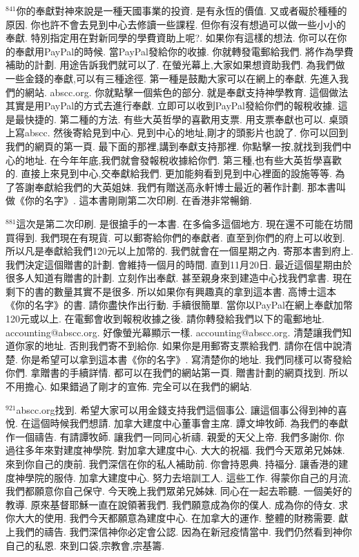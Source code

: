 \documentclass{book}
\begin{document}
$^{841}$你的奉獻對神來說是一種天國事業的投資.
是有永恆的價值.
又或者礙於種種的原因.
你也許不會去見到中心去修讀一些課程.
但你有沒有想過可以做一些小小的奉獻.
特別指定用在對新同學的學費資助上呢?.
如果你有這樣的想法.
你可以在你的奉獻用PayPal的時候.
當PayPal發給你的收據.
你就轉發電郵給我們.
將作為學費補助的計劃.
用途告訴我們就可以了.
在螢光幕上,大家如果想資助我們.
為我們做一些金錢的奉獻,可以有三種途徑.
第一種是鼓勵大家可以在網上的奉獻.
先進入我們的網站.
abscc.org.
你就點擊一個紫色的部分.
就是奉獻支持神學教育.
這個做法其實是用PayPal的方式去進行奉獻.
立即可以收到PayPal發給你們的報稅收據.
這是最快捷的.
第二種的方法.
有些大英哲學的喜歡用支票.
用支票奉獻也可以.
桌頭上寫abscc.
然後寄給見到中心.
見到中心的地址,剛才的頭影片也說了.
你可以回到我們的網頁的第一頁.
最下面的那裡,講到奉獻支持那裡.
你點擊一按,就找到我們中心的地址.
在今年年底,我們就會發報稅收據給你們.
第三種,也有些大英哲學喜歡的.
直接上來見到中心,交奉獻給我們.
更加能夠看到見到中心裡面的設施等等.
為了答謝奉獻給我們的大英姐妹.
我們有贈送高永軒博士最近的著作計劃.
那本書叫做《你的名字》.
這本書剛剛第二次印刷.
在香港非常暢銷.

$^{881}$這次是第二次印刷.
是很搶手的一本書.
在多倫多這個地方.
現在還不可能在坊間買得到.
我們現在有現貨.
可以郵寄給你們的奉獻者.
直至到你們的府上可以收到.
所以凡是奉獻給我們120元以上加幣的.
我們就會在一個星期之內.
寄那本書到府上.
我們決定這個贈書的計劃.
會維持一個月的時間.
直到11月20日.
最近這個星期由於很多人知道有贈書的計劃.
立刻作出奉獻.
甚至親身來到建造中心找我們拿書.
現在剩下的書的數量其實不是很多.
所以如果你有興趣真的拿到這本書.
高博士這本《你的名字》的書.
請你盡快作出行動.
手續很簡單.
當你以PayPal在網上奉獻加幣120元或以上.
在電郵會收到報稅收據之後.
請你轉發給我們以下的電郵地址.
accounting@abscc.org.
好像螢光幕顯示一樣.
accounting@abscc.org.
清楚讓我們知道你家的地址.
否則我們寄不到給你.
如果你是用郵寄支票給我們.
請你在信中說清楚.
你是希望可以拿到這本書《你的名字》.
寫清楚你的地址.
我們同樣可以寄發給你們.
拿贈書的手續詳情.
都可以在我們的網站第一頁.
贈書計劃的網頁找到.
所以不用擔心.
如果錯過了剛才的宣佈.
完全可以在我們的網站.

$^{921}$abscc.org找到.
希望大家可以用金錢支持我們這個事公.
讓這個事公得到神的喜悅.
在這個時候我們想請.
加拿大建度中心董事會主席.
譚文坤牧師.
為我們的奉獻作一個禱告.
有請譚牧師.
讓我們一同同心祈禱.
親愛的天父上帝.
我們多謝你.
你過往多年來對建度神學院.
對加拿大建度中心.
大大的祝福.
我們今天眾弟兄姊妹.
來到你自己的庚前.
我們深信在你的私人補助前.
你會持恩典.
持福分.
讓香港的建度神學院的服侍.
加拿大建度中心.
努力去培訓工人.
這些工作.
得蒙你自己的月流.
我們都願意你自己保守.
今天晚上我們眾弟兄姊妹.
同心在一起去聆聽.
一個美好的教導.
原來基督耶穌一直在說領著我們.
我們願意成為你的僕人.
成為你的侍女.
求你大大的使用.
我們今天都願意為建度中心.
在加拿大的運作.
整體的財務需要.
獻上我們的禱告.
我們深信神你必定會公認.
因為在新冠疫情當中.
我們仍然看到神你自己的私恩.
來到口袋,宗教會,宗基籌.
\end{document}
